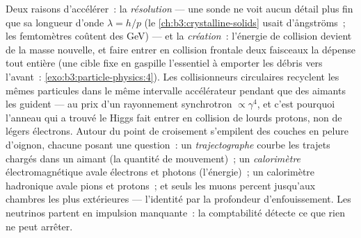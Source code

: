 \begin{remark}\label{rem:b3:particle-physics:machines}
Deux raisons d'accélérer~: la \emph{résolution} --- une sonde ne voit
aucun détail plus fin que sa longueur d'onde $\lambda = h/p$ (le
\cref{ch:b3:crystalline-solids} usait d'ångströms~; les femtomètres
coûtent des \unit{GeV}) --- et la \emph{création}~: l'énergie de
collision devient de la masse nouvelle, et faire entrer en collision
frontale deux faisceaux la dépense tout entière (une cible fixe en
gaspille l'essentiel à emporter les débris vers l'avant~:
\cref{exo:b3:particle-physics:4}). Les collisionneurs circulaires
recyclent les mêmes particules dans le même intervalle accélérateur
pendant que des aimants les guident --- au prix d'un rayonnement
synchrotron $\propto\gamma^4$, et c'est pourquoi l'anneau qui a
trouvé le Higgs fait entrer en collision de lourds protons, non de
légers électrons. Autour du point de croisement s'empilent des
couches en pelure d'oignon, chacune posant une question~: un
\emph{trajectographe} courbe les trajets chargés dans un aimant (la
quantité de mouvement)~; un \emph{calorimètre} électromagnétique
avale électrons et photons (l'énergie)~; un calorimètre hadronique
avale pions et protons~; et seuls les muons percent jusqu'aux
chambres les plus extérieures --- l'identité par la profondeur
d'enfouissement. Les neutrinos partent en impulsion manquante~: la
comptabilité détecte ce que rien ne peut arrêter.
\end{remark}

